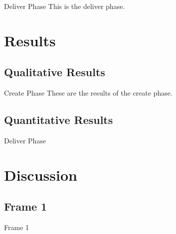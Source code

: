 \documentclass[xcolor=x11names,compress]{beamer}
\renewcommand{\(}{\begin{columns}}
\renewcommand{\)}{\end{columns}}
\newcommand{\<}[1]{\begin{column}{#1}}
\renewcommand{\>}{\end{column}}
\begin{document}
\begin{frame}{Deliver Phase}
This is the deliver phase.
\end{frame}


\section{Results}
\subsection{Qualitative Results}
\begin{frame}{Create Phase}
These are the results of the create phase.
\end{frame}

\subsection{Quantitative Results}
\begin{frame}{Deliver Phase}
\end{frame}

\section{Discussion}
\subsection{Frame 1}
\begin{frame}{Frame 1}

\end{frame}



\end{document}
